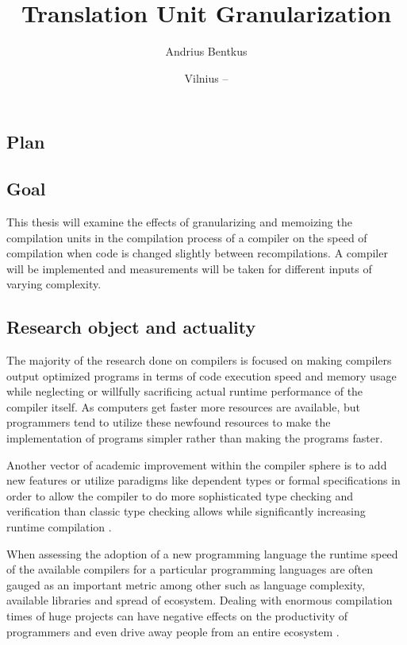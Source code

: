 \documentclass{VUMIFPSbakalaurinis}
\institute{Informatikos institutas}  %
\title{Translation Unit Granularization}
\author{Andrius Bentkus}
\date{Vilnius – \the\year}
\begin{document}
\maketitle



\begin{samepage}
\section{Plan}
\subsection{Goal}
This thesis will examine the effects of granularizing and memoizing the compilation units in the compilation process of a compiler on the speed of compilation when code is changed slightly between recompilations.
A compiler will be implemented and measurements will be taken for different inputs of varying complexity.

\subsection{Research object and actuality}
The majority of the research done on compilers is focused on making compilers output optimized programs in terms of code execution speed and memory usage \cite{lopes2018future} while neglecting or willfully sacrificing \cite{fast2019compilers} actual runtime performance of the compiler itself.
As computers get faster more resources are available, but programmers tend to utilize these newfound resources to make the implementation of programs simpler rather than making the programs faster\cite{Wirth1995}.

Another vector of academic improvement within the compiler sphere is to add new features or utilize paradigms like dependent types or formal specifications\cite{RustVerification} in order to allow the compiler to do more sophisticated type checking and verification than classic type checking allows while significantly increasing runtime compilation .

When assessing the adoption of a new programming language the runtime speed of the available compilers for a particular programming languages are often gauged as an important metric\cite{ScalaSlow} among other such as language complexity, available libraries and spread of ecosystem.
Dealing with enormous compilation times of huge projects can have negative effects on the productivity of programmers and even drive away people from an entire ecosystem \cite{ScalaReallySlow, ScalaSlow}.


\end{samepage}
\end{document}
